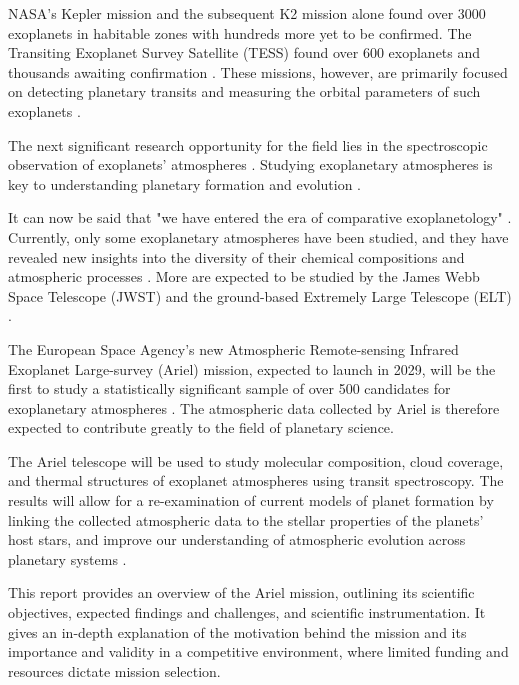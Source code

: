 \documentclass[12pt]{article}
\begin{document}
NASA's Kepler mission and the subsequent K2 mission alone found over 3000 exoplanets in habitable zones with hundreds more yet to be confirmed. The Transiting Exoplanet Survey Satellite (TESS)
found over 600 exoplanets and thousands awaiting confirmation \cite{exoplanet_and_candidate_statitics_2025}. These missions, however, are primarily focused on detecting planetary transits and measuring the orbital parameters of such exoplanets \cite{zingales2018ariel}.

The next significant research opportunity for the field lies in the spectroscopic observation of exoplanets' atmospheres \cite{madhusudhan2019exoplanetary}.
Studying exoplanetary atmospheres is key to understanding planetary formation and evolution \cite{zingales2018ariel}.

It can now be said that "we have entered the era of comparative exoplanetology" \cite[p.617]{madhusudhan2019exoplanetary}.
Currently, only some exoplanetary atmospheres have been studied, and they have revealed new insights into the diversity of their chemical compositions and atmospheric processes \cite{madhusudhan2019exoplanetary}.
More are expected to be studied by the James Webb Space Telescope (JWST) and the ground-based Extremely Large Telescope (ELT) \cite{beichman2014observations}.

The European Space Agency's new Atmospheric Remote-sensing Infrared Exoplanet Large-survey (Ariel) mission, expected to launch in 2029, will be the first to study a statistically significant sample of over
500 candidates for exoplanetary atmospheres \cite{zingales2018ariel}.
The atmospheric data collected by Ariel is therefore expected to contribute greatly to the field of planetary science.

The Ariel telescope will be used to study molecular composition, cloud coverage, and thermal structures of exoplanet atmospheres using transit spectroscopy. The results will allow for a re-examination of 
current models of planet formation by linking the collected atmospheric data to the stellar properties of the planets' host stars, and improve our understanding of atmospheric evolution across planetary systems \cite{edwards2019updated}.

This report provides an overview of the Ariel mission, outlining its scientific objectives, expected findings and challenges, and scientific instrumentation. It gives an in-depth explanation of the motivation behind the mission and its importance and validity
in a competitive environment, where limited funding and resources dictate mission selection.
\end{document}
